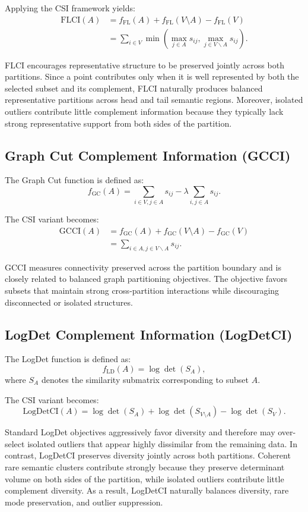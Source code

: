 \documentclass[11pt]{article}
\begin{document}
Applying the CSI framework yields:
\begin{align}
\text{FLCI}(A)
&=
f_{\text{FL}}(A)
+
f_{\text{FL}}(V\setminus A)
-
f_{\text{FL}}(V)
\nonumber \\
&=
\sum_{i \in V}
\min\left(
\max_{j \in A} s_{ij},
\max_{j \in V \backslash A} s_{ij}
\right).
\end{align}

FLCI encourages representative structure to be preserved jointly across both partitions. Since a point contributes only when it is well represented by both the selected subset and its complement, FLCI naturally produces balanced representative partitions across head and tail semantic regions. Moreover, isolated outliers contribute little complement information because they typically lack strong representative support from both sides of the partition.

\subsection{Graph Cut Complement Information (GCCI)}

The Graph Cut function is defined as:
\[
f_{\text{GC}}(A)
=
\sum_{i\in V,j\in A}s_{ij}
-
\lambda\sum_{i,j\in A}s_{ij}.
\]

The CSI variant becomes:
\begin{align}
\text{GCCI}(A)
&=
f_{\text{GC}}(A)
+
f_{\text{GC}}(V\setminus A)
-
f_{\text{GC}}(V)
\nonumber \\
&=
\sum_{i \in A, j \in V \backslash A} s_{ij}.
\end{align}

GCCI measures connectivity preserved across the partition boundary and is closely related to balanced graph partitioning objectives. The objective favors subsets that maintain strong cross-partition interactions while discouraging disconnected or isolated structures.

\subsection{LogDet Complement Information (LogDetCI)}

The LogDet function is defined as:
\[
f_{\text{LD}}(A)
=
\log\det(S_A),
\]
where $S_A$ denotes the similarity submatrix corresponding to subset $A$.

The CSI variant becomes:
\[
\text{LogDetCI}(A)
=
\log\det(S_A)
+
\log\det(S_{V\setminus A})
-
\log\det(S_V).
\]

Standard LogDet objectives aggressively favor diversity and therefore may over-select isolated outliers that appear highly dissimilar from the remaining data. In contrast, LogDetCI preserves diversity jointly across both partitions. Coherent rare semantic clusters contribute strongly because they preserve determinant volume on both sides of the partition, while isolated outliers contribute little complement diversity. As a result, LogDetCI naturally balances diversity, rare mode preservation, and outlier suppression.
\end{document}
